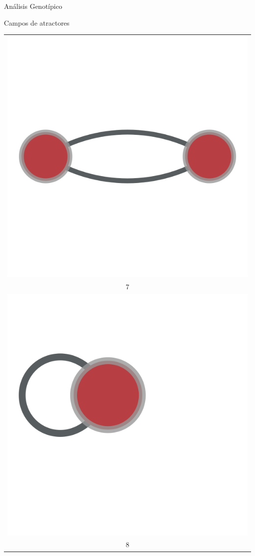 \documentclass[12pt, letterpaper]{article}
\begin{document}
\begin{section}{Análisis Genotípico}
\begin{subsection}{Campos de atractores}
\begin{longtable}{|c|}
  \includegraphics[width=.5\textwidth ,keepaspectratio ]{22_16_s_t_2s_r_2m_l_1atractor_13107_.png} \\ 
    7 \\ \hline 
  \includegraphics[width=.5\textwidth ,keepaspectratio ]{22_16_s_t_1s_r_1m_l_1atractor_21845_.png} \\ 
    8 \\ \hline 
  \end{longtable}
  \end{subsection} 
 \end{section} 
\end{document}
